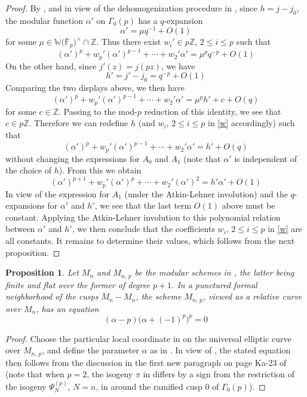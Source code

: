 \documentclass{rs}
\newtheorem{prop}[equation]{Proposition}
\theoremstyle{definition}
\theoremstyle{remark}
\newcommand{\mb}[1]{\mathbb{#1}}
\newcommand{\cF}{\overline {\mb F}}
\newcommand{\BW}{{\mb W}}
\newcommand{\BZ}{{\mb Z}}
\newcommand{\A}{\alpha}
\newcommand{\G}{\Gamma}
\renewcommand{\=}{\approx}
\renewcommand{\-}{\sim}
\numberwithin{equation}{section}
\begin{document}
\begin{proof}
 By \cite[12.4.1]{KM}, \cite[Remark 3.2]{ho} and in view of the dehomogenization procedure in \cite[Example 2.6, Proposition 2.8, and Example 3.4]{ho}, 
 since $h = j - j_0$, the modular function $\A'$ on $\G_0(p)$ has a $q$-expansion 
 \[
  \A' = \mu q^{-1} + O(1) 
 \]
 for some $\mu \in \BW\big(\cF_p\big)^\times \cap \BZ$.  
 Thus there exist $w_i' \in p\BZ$, $2 \leq i \leq p$ such that 
 \[
  (\A')^p + w_p' (\A')^{p - 1} + \cdots + w_2' \A' = \mu^p q^{-p} + O(1) 
 \]
 On the other hand, since $j'(z) = j(p z)$, we have 
 \[
  h' = j' - j_0 = q^{-p} + O(1) 
 \]
 Comparing the two displays above, we then have 
 \[
  (\A')^p + w_p' (\A')^{p - 1} + \cdots + w_2' \A' = \mu^p h' + c + O(q) 
 \]
 for some $c \in \BZ$.  
 Passing to the mod-$p$ reduction of this identity, 
 we see that $c \in p\BZ$.  
 Therefore we can redefine $h$ (and $w_i$, $2 \leq i \leq p$ in \eqref{w} accordingly) such that 
 \[
  (\A')^p + w_p' (\A')^{p - 1} + \cdots + w_2' \A' = h' + O(q) 
 \]
 without changing the expressions for $A_0$ and $A_1$ (note that $\A'$ is independent of the choice of $h$).  
 From this we obtain 
 \[
  (\A')^{p + 1} + w_p' (\A')^p + \cdots + w_2' (\A')^2 = h' \A' + O(1) 
 \]
 In view of the expression for $A_1$ (under the Atkin-Lehner involution) and the $q$-expansions for $\A'$ and $h'$, 
 we see that the last term $O(1)$ above must be constant.  
 Applying the Atkin-Lehner involution to this polynomial relation between $\A'$ and $h'$, 
 we then conclude that the coefficients $w_i$, $2 \leq i \leq p$ in \eqref{w} are all constants.  
 It remains to determine their values, which follows from the next proposition.  
\end{proof}

\begin{prop}
 Let $M_n$ and $M_{n,\,p}$ be the modular schemes in \cite[Section 1.13]{padicprop}, 
 the latter being finite and flat over the former of degree $p + 1$.  
 In a punctured formal neighborhood of the cusps $\overline{M}_n - M_n$, the scheme $M_{n,\,p}$, viewed as a relative curve over $M_n$, has an equation 
 \[
  (\A - p) \big(\A + (-1)^p\big)^p = 0 
 \]
\end{prop}

\begin{proof}
 Choose the particular local coordinate in \cite[Theorem 4]{Ando95} on the universal elliptic curve over $M_{n,\,p}$, 
 and define the parameter $\A$ as in \cite[Section 3.1, esp.~Construction 3.1\,(ii) and Remark 3.2]{ho}.  
 In view of \cite[Remark 3.15]{ho}, the stated equation then follows from the discussion in the first new paragraph on page Ka-23 of \cite{padicprop} 
 (note that when $p = 2$, the isogeny $\pi$ in \cite[Section 1.11]{padicprop} differs by a sign from 
 the restriction of the isogeny $\Psi_N^{(p)}$, $N = n$, in \cite[Section 3]{ho} around the ramified cusp 0 of $\G_0(p)$).  
\end{proof}
\end{document}
